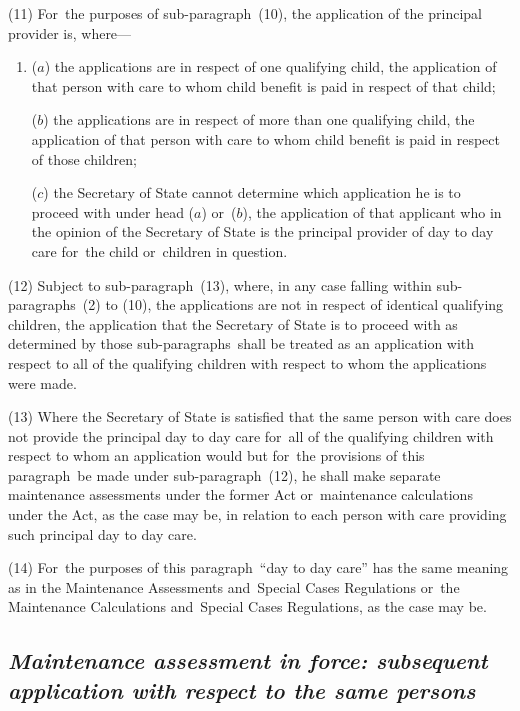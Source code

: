 \documentclass[12pt,a4paper]{article}
\begin{document}
(11) For~the purposes of sub-paragraph~(10), the application of the principal provider is, where—
\begin{enumerate}\item[]
($a$) the applications are in respect of one qualifying child, the application of that person with care to whom child benefit is paid in respect of that child;

($b$) the applications are in respect of more than one qualifying child, the application of that person with care to whom child benefit is paid in respect of those children;

($c$) the Secretary of State cannot determine which application he is to proceed with under head ($a$)  or~($b$), the application of that applicant who in the opinion of the Secretary of State is the principal provider of day to day care for~the child or~children in question.
\end{enumerate}

(12) Subject to sub-paragraph~(13), where, in any case falling within sub-paragraphs~(2) to (10), the applications are not in respect of identical qualifying children, the application that the Secretary of State is to proceed with as determined by those sub-paragraphs~shall be treated as an application with respect to all of the qualifying children with respect to whom the applications were made.

(13) Where the Secretary of State is satisfied that the same person with care does not provide the principal day to day care for~all of the qualifying children with respect to whom an application would but for~the provisions of this paragraph~be made under sub-paragraph~(12), he shall make separate maintenance assessments under the former Act or~maintenance calculations under the Act, as the case may be, in relation to each person with care providing such principal day to day care.

(14) For~the purposes of this paragraph~“day to day care” has the same meaning as in the Maintenance Assessments and~Special Cases Regulations or~the Maintenance Calculations and~Special Cases Regulations, as the case may be.


\subsection*{\itshape Maintenance assessment in force: subsequent application with respect to the same persons}
\end{document}

